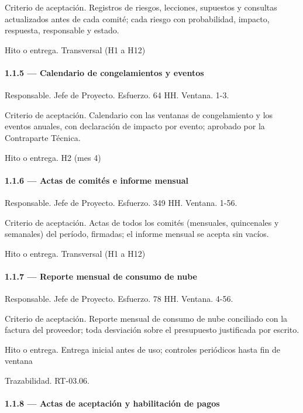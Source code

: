 \documentclass[11pt]{article}
\begin{document}
Criterio de aceptación. Registros de riesgos, lecciones, supuestos y consultas actualizados antes de cada comité; cada riesgo con probabilidad, impacto, respuesta, responsable y estado.

Hito o entrega. Transversal (H1 a H12)

\paragraph{1.1.5 — Calendario de congelamientos y eventos}

Responsable. Jefe de Proyecto. Esfuerzo. 64 HH. Ventana. 1-3.

Criterio de aceptación. Calendario con las ventanas de congelamiento y los eventos anuales, con declaración de impacto por evento; aprobado por la Contraparte Técnica.

Hito o entrega. H2 (mes 4)

\paragraph{1.1.6 — Actas de comités e informe mensual}

Responsable. Jefe de Proyecto. Esfuerzo. 349 HH. Ventana. 1-56.

Criterio de aceptación. Actas de todos los comités (mensuales, quincenales y semanales) del período, firmadas; el informe mensual se acepta sin vacíos.

Hito o entrega. Transversal (H1 a H12)

\paragraph{1.1.7 — Reporte mensual de consumo de nube}

Responsable. Jefe de Proyecto. Esfuerzo. 78 HH. Ventana. 4-56.

Criterio de aceptación. Reporte mensual de consumo de nube conciliado con la factura del proveedor; toda desviación sobre el presupuesto justificada por escrito.

Hito o entrega. Entrega inicial antes de uso; controles periódicos hasta fin de ventana

Trazabilidad. RT-03.06.

\paragraph{1.1.8 — Actas de aceptación y habilitación de pagos}
\end{document}
